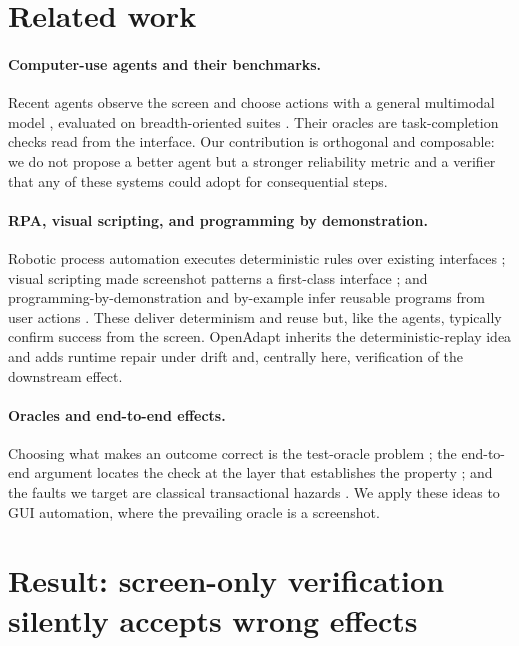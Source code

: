 \documentclass[10pt]{article}
\newcommand{\system}{OpenAdapt}
\begin{document}
\section{Related work}
\label{sec:related}

\paragraph{Computer-use agents and their benchmarks.} Recent agents observe the
screen and choose actions with a general multimodal model
\cite{anthropic2024computeruse,uitars2025,cheng2024seeclick}, evaluated on
breadth-oriented suites \cite{webarena,workarena,osworld}. Their oracles are
task-completion checks read from the interface. Our contribution is orthogonal
and composable: we do not propose a better agent but a stronger reliability
metric and a verifier that any of these systems could adopt for consequential
steps.

\paragraph{RPA, visual scripting, and programming by demonstration.} Robotic
process automation executes deterministic rules over existing interfaces
\cite{vanderaalst2018rpa}; visual scripting made screenshot patterns a
first-class interface \cite{sikuli}; and programming-by-demonstration and
by-example infer reusable programs from user actions
\cite{cypher1993watch,gulwani2011automating,chasins2018rousillon}. These deliver
determinism and reuse but, like the agents, typically confirm success from the
screen. \system{} inherits the deterministic-replay idea and adds runtime repair
under drift and, centrally here, verification of the downstream effect.

\paragraph{Oracles and end-to-end effects.} Choosing what makes an outcome
correct is the test-oracle problem \cite{barr2015oracle}; the end-to-end argument
locates the check at the layer that establishes the property \cite{saltzer1984end};
and the faults we target are classical transactional hazards
\cite{gray1981transaction}. We apply these ideas to GUI automation, where the
prevailing oracle is a screenshot.

\section{Result: screen-only verification silently accepts wrong effects}
\label{sec:faults}
\end{document}
